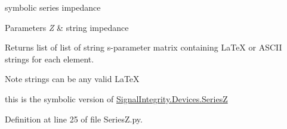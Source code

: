 symbolic series impedance 


\begin{DoxyParams}{Parameters}
{\em Z} & string impedance \\
\hline
\end{DoxyParams}
\begin{DoxyReturn}{Returns}
list of list of string s-\/parameter matrix containing La\+TeX or A\+S\+C\+II strings for each element. 
\end{DoxyReturn}
\begin{DoxyNote}{Note}
strings can be any valid La\+TeX 

this is the symbolic version of \hyperlink{namespaceSignalIntegrity_1_1Devices_1_1SeriesZ}{Signal\+Integrity.\+Devices.\+SeriesZ} 
\end{DoxyNote}


Definition at line 25 of file Series\+Z.\+py.

